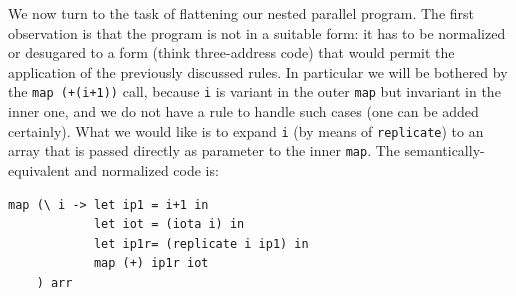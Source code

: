 \documentclass[acmsmall,review]{acmart}\settopmatter{printfolios=true,printccs=false,printacmref=false}
\begin{document}
We now turn to the task of flattening our nested parallel program.
The first observation is that the program is not in a suitable form:
it has to be normalized or desugared to a form (think three-address code) 
that would permit the application of the previously discussed rules.
In particular we will be bothered by the {\tt map (+(i+1))} call,
because {\tt i} is variant in the outer \lstinline{map} but
invariant in the inner one, and we do not have a rule to handle
such cases (one can be added certainly). What we would like is to
expand {\tt i} (by means of \lstinline{replicate}) to an array that 
is passed directly as parameter to the inner \lstinline{map}.
The semantically-equivalent and normalized code is:
\begin{lstlisting}[mathescape=true]
map (\ i -> let ip1 = i+1 in
            let iot = (iota i) in
            let ip1r= (replicate i ip1) in
            map (+) ip1r iot
    ) arr
\end{lstlisting}\vspace{-2ex}
  
\end{document}
